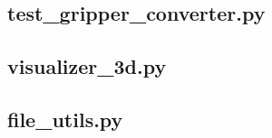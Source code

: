 \documentclass[12pt, a4paper]{article}
\begin{document}
\subsection{test\_gripper\_converter.py}


\subsection{visualizer\_3d.py}


\subsection{file\_utils.py}


\printbibliography
% 
% 
  
\end{document}
